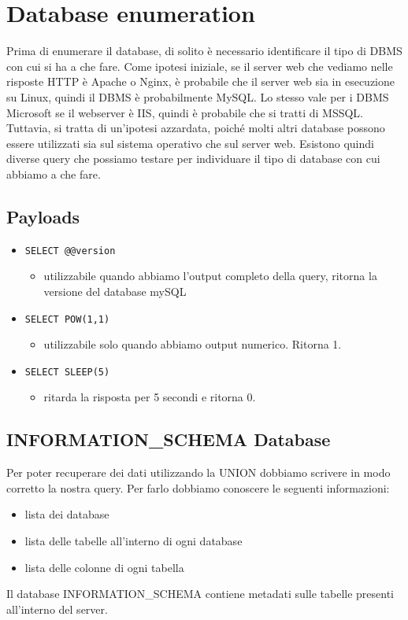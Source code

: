 \section{Database enumeration}
Prima di enumerare il database, di solito è necessario identificare il tipo di DBMS con cui si ha a che fare. 
Come ipotesi iniziale, se il server web che vediamo nelle risposte HTTP è Apache o Nginx, è probabile che il server web sia in esecuzione su Linux, quindi il DBMS è probabilmente MySQL. Lo stesso vale per i DBMS Microsoft se il webserver è IIS, quindi è probabile che si tratti di MSSQL. Tuttavia, si tratta di un'ipotesi azzardata, poiché molti altri database possono essere utilizzati sia sul sistema operativo che sul server web. Esistono quindi diverse query che possiamo testare per individuare il tipo di database con cui abbiamo a che fare.

\subsection{Payloads}
\begin{itemize}
    \item \begin{verbatim}SELECT @@version\end{verbatim}
    \begin{itemize}
        \item utilizzabile quando abbiamo l'output completo della query, ritorna la versione del database mySQL
    \end{itemize}
    \item \begin{verbatim}SELECT POW(1,1)\end{verbatim}
    \begin{itemize}
        \item utilizzabile solo quando abbiamo output numerico. Ritorna 1.
    \end{itemize}
    \item \begin{verbatim}SELECT SLEEP(5)\end{verbatim}
    \begin{itemize}
        \item ritarda la risposta per 5 secondi e ritorna 0.
    \end{itemize}
\end{itemize}

\subsection{INFORMATION\_SCHEMA Database}
Per poter recuperare dei dati utilizzando la UNION dobbiamo scrivere in modo corretto la nostra query. Per farlo dobbiamo conoscere le seguenti informazioni:
\begin{itemize}
    \item lista dei database
    \item lista delle tabelle all'interno di ogni database
    \item lista delle colonne di ogni tabella
\end{itemize}
Il database INFORMATION\_SCHEMA contiene metadati sulle tabelle presenti all'interno del server.

